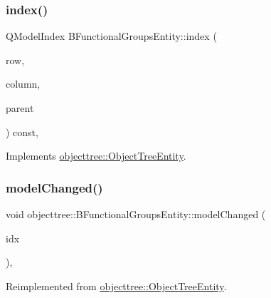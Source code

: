 \mbox{\label{classobjecttree_1_1_b_functional_groups_entity_a52beb91ea69c7ee35ea1da3facc97196}} 
\subsubsection{\texorpdfstring{index()}{index()}}
{\footnotesize\ttfamily Q\+Model\+Index B\+Functional\+Groups\+Entity\+::index (\begin{DoxyParamCaption}\item[{int}]{row,  }\item[{int}]{column,  }\item[{const Q\+Model\+Index \&}]{parent }\end{DoxyParamCaption}) const\hspace{0.3cm}{\ttfamily [override]}, {\ttfamily [virtual]}}



Implements \mbox{\hyperlink{classobjecttree_1_1_object_tree_entity_a9ccaab3b27e65b1ed8b22f00c57a1082}{objecttree\+::\+Object\+Tree\+Entity}}.

\mbox{\label{classobjecttree_1_1_b_functional_groups_entity_aa7b89957ec605a79278a3a26566d44fd}} 
\subsubsection{\texorpdfstring{modelChanged()}{modelChanged()}}
{\footnotesize\ttfamily void objecttree\+::\+B\+Functional\+Groups\+Entity\+::model\+Changed (\begin{DoxyParamCaption}\item[{int}]{idx }\end{DoxyParamCaption})\hspace{0.3cm}{\ttfamily [override]}, {\ttfamily [virtual]}}



Reimplemented from \mbox{\hyperlink{classobjecttree_1_1_object_tree_entity_a167db83e542f7e9e760e7e2a5548cc3a}{objecttree\+::\+Object\+Tree\+Entity}}.

